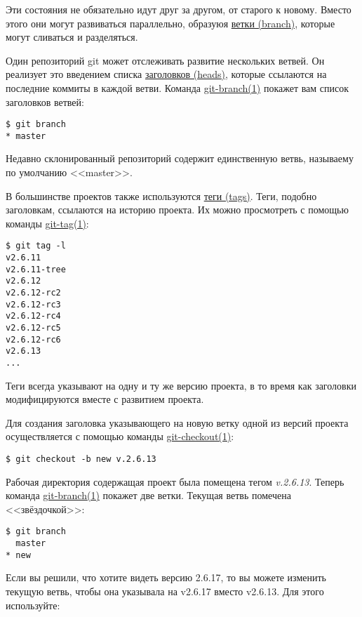 \documentclass[a4paper, 12pt, oneside]{scrreprt}
\begin{document}
Эти состояния не обязательно идут друг за другом, от старого к новому. Вместо этого
они могут развиваться параллельно, образуюя \href{#def_branch}{ветки (branch)},
которые могут сливаться и разделяться.

Один репозиторий git может отслеживать развитие нескольких ветвей. Он реализует это
введением списка \href{#def_head}{заголовков (heads)}, которые ссылаются на
последние коммиты в каждой ветви. Команда \href{http://www.kernel.org/pub/software/scm/git/docs/git-branch.html}{git-branch(1)}
покажет вам список заголовков ветвей:

\begin{lstlisting}
$ git branch
* master
\end{lstlisting}

Недавно склонированный репозиторий содержит единственную ветвь, называему по умолчанию
<<master>>.

В большинстве проектов также используются \href{#def_tag}{теги (tags)}. Теги, подобно
заголовкам, ссылаются на историю проекта. Их можно просмотреть с помощью команды
\href{http://www.kernel.org/pub/software/scm/git/docs/git-tag.html}{git-tag(1)}:

\begin{lstlisting}
$ git tag -l
v2.6.11
v2.6.11-tree
v2.6.12
v2.6.12-rc2
v2.6.12-rc3
v2.6.12-rc4
v2.6.12-rc5
v2.6.12-rc6
v2.6.13
...
\end{lstlisting}

Теги всегда указывают на одну и ту же версию проекта, в то время как заголовки
модифицируются вместе с развитием проекта.

Для создания заголовка указывающего на новую ветку одной из версий проекта
осуществляется с помощью команды
\href{http://www.kernel.org/pub/software/scm/git/docs/git-checkout.html}{git-checkout(1)}:

\begin{lstlisting}
$ git checkout -b new v.2.6.13
\end{lstlisting}

Рабочая директория содержащая проект была помещена тегом \emph{v.2.6.13}. Теперь
команда \href{http://www.kernel.org/pub/software/scm/git/docs/git-branch.html}{git-branch(1)}
покажет две ветки. Текущая ветвь помечена <<звёздочкой>>:

\begin{lstlisting}
$ git branch
  master
* new
\end{lstlisting}

Если вы решили, что хотите видеть версию 2.6.17, то вы можете изменить текущую ветвь,
чтобы она указывала на v2.6.17 вместо v2.6.13. Для этого используйте:
\end{document}
